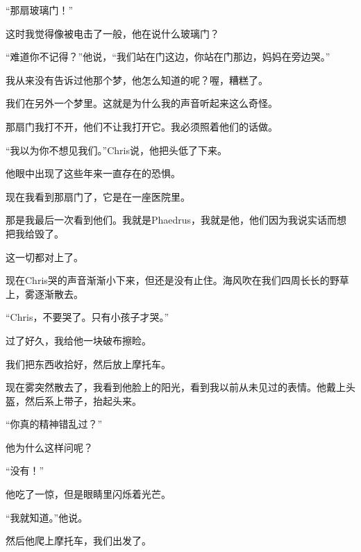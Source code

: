 \documentclass[UTF8]{article}
\begin{document}
\par “那扇玻璃门！”
\par 这时我觉得像被电击了一般，他在说什么玻璃门？
\par “难道你不记得？”他说，“我们站在门这边，你站在门那边，妈妈在旁边哭。”
\par 我从来没有告诉过他那个梦，他怎么知道的呢？喔，糟糕了。
\par 我们在另外一个梦里。这就是为什么我的声音听起来这么奇怪。
\par 那扇门我打不开，他们不让我打开它。我必须照着他们的话做。
\par “我以为你不想见我们。”Chris说，他把头低了下来。
\par 他眼中出现了这些年来一直存在的恐惧。
\par 现在我看到那扇门了，它是在一座医院里。
\par 那是我最后一次看到他们。我就是Phaedrus，我就是他，他们因为我说实话而想把我给毁了。
\par 这一切都对上了。
\par 现在Chris哭的声音渐渐小下来，但还是没有止住。海风吹在我们四周长长的野草上，雾逐渐散去。
\par “Chris，不要哭了。只有小孩子才哭。”
\par 过了好久，我给他一块破布擦睑。
\par 我们把东西收拾好，然后放上摩托车。
\par 现在雾突然散去了，我看到他脸上的阳光，看到我以前从未见过的表情。他戴上头盔，然后系上带子，抬起头来。
\par “你真的精神错乱过？”
\par 他为什么这样问呢？
\par “没有！”
\par 他吃了一惊，但是眼睛里闪烁着光芒。
\par “我就知道。”他说。
\par 然后他爬上摩托车，我们出发了。
\end{document}
